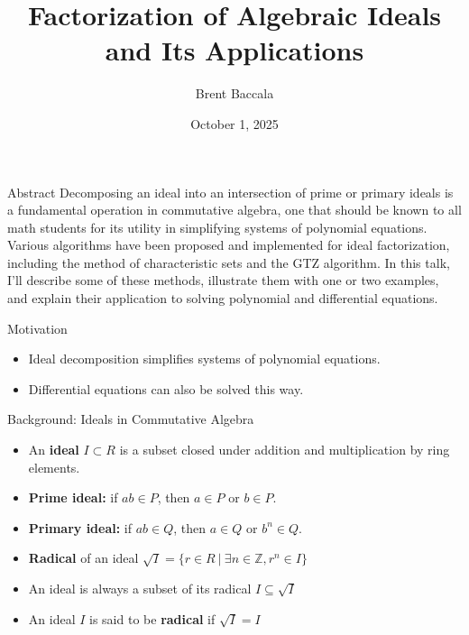 \documentclass[11pt]{beamer}
\title[Factorization of Ideals]{Factorization of Algebraic Ideals and Its Applications}
\author{Brent Baccala}
\institute{\tt cosine@freesoft.org}
\date{October 1, 2025}
\begin{document}
\begin{frame}
  \titlepage


\begin{block}{Abstract}
\tiny
Decomposing an ideal into an intersection of prime or primary ideals is a fundamental operation in commutative algebra, one that should be known to all math students for its utility in simplifying systems of polynomial equations.  Various algorithms have been proposed and implemented for ideal factorization, including the method of characteristic sets and the GTZ algorithm.  In this talk, I'll describe some of these methods, illustrate them with one or two examples, and explain their application to solving polynomial and differential equations.
\end{block}

\end{frame}

\begin{frame}{Motivation}
\begin{itemize}
  \item Ideal decomposition simplifies systems of polynomial equations.
  \item Differential equations can also be solved this way.
\end{itemize}
\end{frame}

\begin{frame}{Background: Ideals in Commutative Algebra}
\begin{itemize}
  \item An \textbf{ideal} $I \subset R$ is a subset closed under addition and multiplication by ring elements.
  \item \textbf{Prime ideal:} if $ab \in P$, then $a \in P$ or $b \in P$.
  \item \textbf{Primary ideal:} if $ab \in Q$, then $a \in Q$ or $b^n \in Q$.
  \item \textbf{Radical} of an ideal $\sqrt{I} = \{ r \in R \ | \ \exists n \in \mathbb{Z}, r^n \in I\}$
  \item An ideal is always a subset of its radical $I \subseteq \sqrt{I}$
  \item An ideal $I$ is said to be \textbf{radical} if $\sqrt{I} = I$
\end{itemize}
\end{frame}
\end{document}
